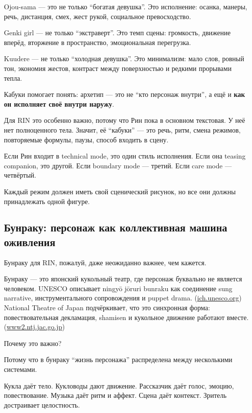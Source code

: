 Ojou-sama --- это не только ``богатая девушка''. Это исполнение: осанка,
манеры, речь, дистанция, смех, жест рукой, социальное превосходство.

Genki girl --- не только ``экстраверт''. Это темп сцены: громкость,
движение вперёд, вторжение в пространство, эмоциональная перегрузка.

Kuudere --- не только ``холодная девушка''. Это минимализм: мало слов,
ровный тон, экономия жестов, контраст между поверхностью и редкими
прорывами тепла.

Кабуки помогает понять: архетип --- это не ``кто персонаж внутри'', а
ещё и \textbf{как он исполняет своё внутри наружу}.

Для RIN это особенно важно, потому что Рин пока в основном текстовая. У
неё нет полноценного тела. Значит, её ``кабуки'' --- это речь, ритм,
смена режимов, повторяемые формулы, паузы, способ входить в сцену.

Если Рин входит в technical mode, это один стиль исполнения. Если она
teasing companion, это другой. Если boundary mode --- третий. Если care
mode --- четвёртый.

Каждый режим должен иметь свой сценический рисунок, но все они должны
принадлежать одной фигуре.

\subsection*{Бунраку: персонаж как коллективная машина оживления}

Бунраку для RIN, пожалуй, даже неожиданно важнее, чем кажется.

Бунраку --- это японский кукольный театр, где персонаж буквально не
является человеком. UNESCO описывает ningyō jōruri bunraku как
соединение sung narrative, инструментального сопровождения и puppet
drama.
(\href{https://ich.unesco.org/en/RL/ningyo-johruri-bunraku-puppet-theatre-00064?utm_source=chatgpt.com}{ich.unesco.org})
National Theatre of Japan подчёркивает, что это синхронная форма:
повествовательная декламация, shamisen и кукольное движение работают
вместе.
(\href{https://www2.ntj.jac.go.jp/unesco/bunraku/en/introduction/index.html?utm_source=chatgpt.com}{www2.ntj.jac.go.jp})

Почему это важно?

Потому что в бунраку ``жизнь персонажа'' распределена между несколькими
системами.

Кукла даёт тело. Кукловоды дают движение. Рассказчик даёт голос, эмоцию,
повествование. Музыка даёт ритм и аффект. Сцена даёт контекст. Зритель
достраивает целостность.

